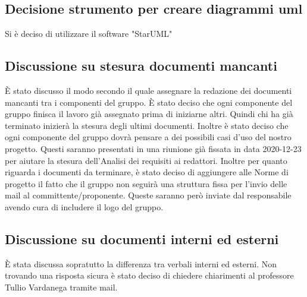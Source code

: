 \subsection*{Decisione strumento per creare diagrammi uml}
Si è deciso di utilizzare il software "StarUML"

\subsection*{Discussione su stesura documenti mancanti}
È stato discusso il modo secondo il quale assegnare la redazione dei documenti mancanti tra i componenti del gruppo. 
È stato deciso che ogni componente del gruppo finisca il lavoro già assegnato prima di iniziarne altri. Quindi chi ha già terminato inizierà la stesura degli ultimi documenti. 
Inoltre è stato deciso che ogni componente del gruppo dovrà pensare a dei possibili casi d'uso del nostro progetto. Questi saranno presentati in una riunione già fissata in data 2020-12-23 per aiutare la stesura dell'Analisi dei requisiti ai redattori. 
Inoltre per quanto riguarda i documenti da terminare, è stato deciso di aggiungere alle Norme di progetto il fatto che il gruppo non seguirà una struttura fissa per l'invio delle mail al committente/proponente. Queste saranno però inviate dal responsabile avendo cura di includere il logo del gruppo.

\subsection*{Discussione su documenti interni ed esterni}
È stata discussa sopratutto la differenza tra verbali interni ed esterni. Non trovando una risposta sicura è stato deciso di chiedere chiarimenti al professore Tullio Vardanega tramite mail.		


			






			





